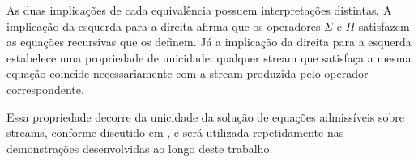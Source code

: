 As duas implicações de cada equivalência possuem interpretações distintas. A implicação da esquerda para a direita afirma que os operadores $\Sigma$ e $\Pi$ satisfazem as equações recursivas que os definem. Já a implicação da direita para a esquerda estabelece uma propriedade de unicidade: qualquer stream que satisfaça a mesma equação coincide necessariamente com a stream produzida pelo operador correspondente.

Essa propriedade decorre da unicidade da solução de equações admissíveis sobre streams, conforme discutido em \cite{Hinze2010}, e será utilizada repetidamente nas demonstrações desenvolvidas ao longo deste trabalho.
